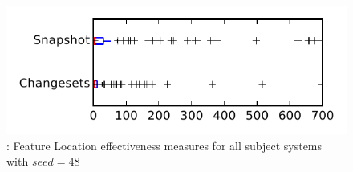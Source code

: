
\begin{figure}
\centering
\includegraphics[height=0.4\textheight]{figures/flt_seed/rq1_tiny_48}
\caption{\rone: Feature Location effectiveness measures for all subject systems with $seed=48$}
\label{fig:flt_seed:rq1:tiny}
\end{figure}
